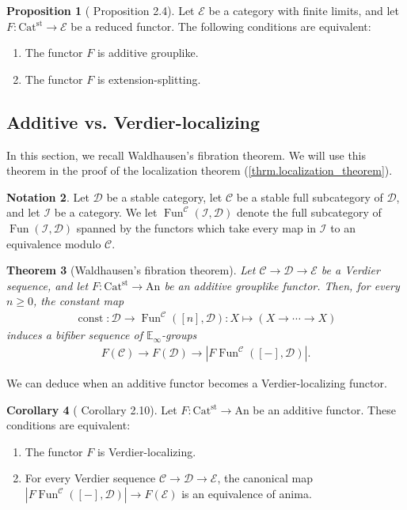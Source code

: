 \documentclass[a4paper,dvipdfmx,11pt,reqno]{amsart}
\DeclareMathOperator{\const}{const}
\DeclareMathOperator{\Fun}{Fun}
\newcommand{\C}{\mathcal{C}}
\newcommand{\D}{\mathcal{D}}
\newcommand{\E}{\mathcal{E}}
\newcommand{\I}{\mathcal{I}}
\newcommand{\An}{\mathrm{An}}
\newcommand{\Catst}{\mathrm{Cat^{st}}}
\newcommand{\Einf}{\mathbb{E}_{\infty}}
\newtheorem{theorem}{Theorem}[section]
\theoremstyle{definition}
\newtheorem{corollary}[theorem]{Corollary}
\newtheorem{notation}[theorem]{Notation}
\newtheorem{proposition}[theorem]{Proposition}
\begin{document}
\begin{proposition}[\cite{HLS23} Proposition 2.4] \label{HLS23.prop.2.4}
  Let $\E$ be a category with finite limits, and let $F : \Catst \to \E$ be a reduced functor.
  The following conditions are equivalent:
  \begin{enumerate}
    \item The functor $F$ is additive grouplike.
    \item The functor $F$ is extension-splitting.
  \end{enumerate}
\end{proposition}

\subsection{Additive vs. Verdier-localizing}

In this section, we recall Waldhausen's fibration theorem.
We will use this theorem in the proof of the localization theorem (\cref{thrm.localization_theorem}).

\begin{notation}
  Let $\D$ be a stable category, let $\C$ be a stable full subcategory of $\D$, and let $\I$ be a category.
  We let $\Fun^{\C}(\I,\D)$ denote the full subcategory of $\Fun(\I,\D)$ spanned by the functors which take every map in $\I$ to an equivalence modulo $\C$.
\end{notation}

\begin{theorem}[Waldhausen's fibration theorem] \label{thrm.Waldhausen_fibration_theorem}
  Let $\C \to \D \to \E$ be a Verdier sequence, and let $F : \Catst \to \An$ be an additive grouplike functor.
  Then, for every $n \geq 0$, the constant map 
  \begin{align*}
    \const : \D \to \Fun^{\C}([n],\D) : X \mapsto (X \to \cdots \to X)
  \end{align*}
  induces a bifiber sequence of $\Einf$-groups 
  \begin{align*}
    F(\C) \to F(\D) \to |F\Fun^{\C}([-],\D)|.
  \end{align*}
\end{theorem}

We can deduce when an additive functor becomes a Verdier-localizing functor.

\begin{corollary}[\cite{HLS23} Corollary 2.10] \label{HLS23.cor.2.10}
  Let $F : \Catst \to \An$ be an additive functor.
  These conditions are equivalent:
  \begin{enumerate}
    \item The functor $F$ is Verdier-localizing.
    \item For every Verdier sequence $\C \to \D \to \E$, the canonical map $|F\Fun^{\C}([-],\D)| \to F(\E)$ is an equivalence of anima.
  \end{enumerate}
\end{corollary}
\end{document}
